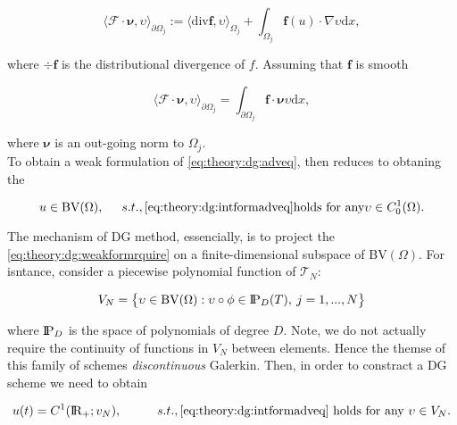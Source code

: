 \begin{equation}
\langle\boldsymbol{\mathcal{F}}\cdot\boldsymbol{\nu},\upsilon\rangle_{\partial\Omega_j} := \langle\text{div}\boldsymbol{f},\upsilon\rangle_{\Omega_j} + \int_{\Omega_j}\boldsymbol{f}(u)\cdot\nabla\upsilon\text{d}x,
\end{equation} 

where $\div\boldsymbol{f}$ is the distributional divergence of $f$. Assuming that $\boldsymbol{f}$ is smooth 

\begin{equation}
\langle\boldsymbol{\mathcal{F}}\cdot\boldsymbol{\nu},\upsilon\rangle_{\partial\Omega_j} = \int_{\partial\Omega_j}\boldsymbol{f}\cdot\boldsymbol{\nu}\upsilon\text{d}x,
\end{equation}

where $\boldsymbol{\nu}$ is an out-going norm to $\Omega_j$. \\
To obtain a weak formulation of \ref{eq:theory:dg:adveq}, then reduces to obtaning the 

\begin{equation}
u\in\text{BV}(\Omega), \hspace{5mm} s.t., \ref{eq:theory:dg:intformadveq} \text{holds for any} \upsilon \in C_0 ^1(\Omega).
\label{eq:theory:dg:weakformrquire}
\end{equation}

The mechanism of DG method, essencially, is to project the \ref{eq:theory:dg:weakformrquire} on a finite-dimensional subspace of BV$(\Omega)$. For isntance, consider a piecewise polynomial function of $\mathcal{T}_{N}$:

\begin{equation}
V_N = \big\{ \upsilon\in\text{BV}(\Omega):\upsilon\circ\phi\in\text{I\!P}_{D}(T), \: j=1,...,N \big\}
\end{equation}

where $\text{I\!P}_{D}$ is the space of polynomials of degree $D$. Note, we do not actually require the continuity of functions in $V_N$ between elements. Hence the themse of this family of schemes \textit{discontinuous} Galerkin. Then, in order to constract a DG scheme we need to obtain

\begin{equation}
u(t) = C^1(\text{I\!R}_{+};v_N), \hspace{10mm} s.t., \ref{eq:theory:dg:intformadveq} \text{ holds for any } \upsilon\in V_N.
\label{eq:theory:dg:weakform}
\end{equation}

